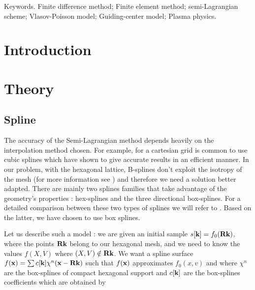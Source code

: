 \documentclass[11pt,a4paper]{amsart}
\begin{document}
\title[]{ }

\author{}

\maketitle

\begin{abstract}



\end{abstract}


\vspace{0.1cm}

\noindent 
{\small\sc Keywords.}  {\small Finite difference method; Finite element method;  semi-Lagrangian scheme; Vlasov-Poisson model; Guiding-center model; Plasma physics.}




\section{Introduction} 
\setcounter{equation}{0}
\label{sec:Intro}





\section{Theory}

\subsection{Spline}
\setcounter{equation}{0}

The accuracy of the Semi-Lagrangian method depends heavily on the interpolation method chosen. For example, for a cartesian grid is common to use cubic splines which have shown to give accurate results in an efficient manner. In our problem, with the hexagonal lattice, B-splines don't exploit the isotropy of the mesh (for more information see \cite{Mersereau79-IEEE}) and therefore we need a solution better adapted.  There are mainly two splines families that take advantage of the geometry's properties : hex-splines and the three directional box-splines. For a detailed comparison between these two types of splines we will refer to \cite{Condat2007}. Based on the latter, we have chosen to use box splines.

Let us describe such a model : we are given an initial sample $s[\mathbf{k}] = f_0(\mathbf{R} \mathbf{k})$, where the points $\mathbf{R} \mathbf{k}$ belong to our hexagonal mesh, and we need to know the values $f(X,V)$ where $(X,V) \notin \mathbf{R} \mathbf{k}$. We want a spline surface $f(\mathbf{x}) = \sum c[\mathbf{k}] \chi^n(\mathbf{x} - \mathbf{R}\mathbf{k})$ such that $f(\mathbf{x})$ approximates $f_0(x,v)$ and where $\chi^n$ are the box-splines of compact hexagonal support and $c[\mathbf{k}]$ are the box-splines coefficients which are obtained by \cite{Condat2006a}
\end{document}
